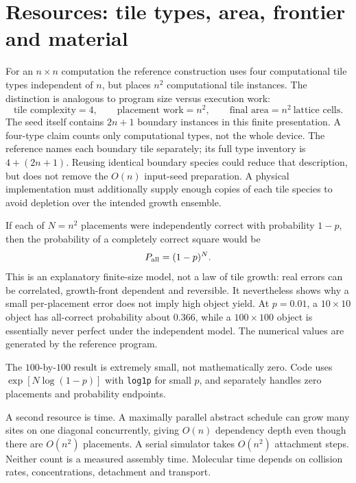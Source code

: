 \section{Resources: tile types, area, frontier and material}

For an $n\times n$ computation the reference construction uses four computational
tile types independent of $n$, but places $n^2$ computational tile instances.
The distinction is analogous to program size versus execution work:
\[
\text{tile complexity}=4,\qquad
\text{placement work}=n^2,\qquad
\text{final area}=n^2\ \text{lattice cells}.
\]
The seed itself contains $2n+1$ boundary instances in this finite presentation.
A four-type claim counts only computational types, not the whole device.
The reference names each boundary tile separately; its full type inventory
is $4+(2n+1)$. Reusing identical boundary species could reduce that description,
but does not remove the $O(n)$ input-seed preparation.
A physical implementation must additionally supply enough copies of each tile
species to avoid depletion over the intended growth ensemble.

If each of $N=n^2$ placements were independently correct with probability
$1-p$, then the probability of a completely correct square would be
\begin{equation}
P_{\rm all}=(1-p)^N.
\label{dnad22:yield}
\end{equation}
This is an explanatory finite-size model, not a law of tile growth: real errors
can be correlated, growth-front dependent and reversible. It nevertheless shows
why a small per-placement error does not imply high object yield. At $p=0.01$,
a $10\times10$ object has all-correct probability about $0.366$, while a
$100\times100$ object is essentially never perfect under the independent model.
The numerical values are generated by the reference program.
\begin{center}\end{center}
The $100$-by-$100$ result is extremely small, not mathematically zero. Code uses
$\exp[N\log(1-p)]$ with \texttt{log1p} for small $p$, and separately handles
zero placements and probability endpoints.

A second resource is time. A maximally parallel abstract schedule can grow many
sites on one diagonal concurrently, giving $O(n)$ dependency depth even though
there are $O(n^2)$ placements. A serial simulator takes $O(n^2)$ attachment
steps. Neither count is a measured assembly time. Molecular time depends on
collision rates, concentrations, detachment and transport.


